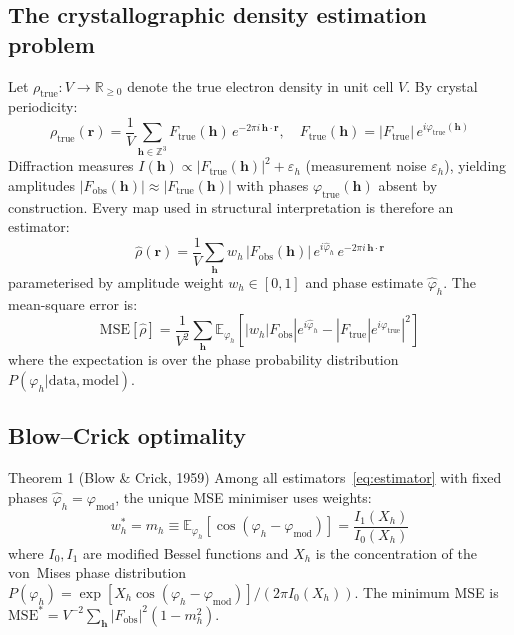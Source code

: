 \documentclass[10pt,twocolumn]{article}
\newcommand{\Fobs}{F_{\!\mathrm{obs}}}
\newcommand{\Ftrue}{F_{\!\mathrm{true}}}
\newcommand{\phimod}{\varphi_{\mathrm{mod}}}
\newcommand{\phitrue}{\varphi_{\mathrm{true}}}
\newcommand{\phih}{\varphi_h}
\newcommand{\mh}{m_h}
\newcommand{\Xh}{X_h}
\newcommand{\rhoT}{\rho_{\mathrm{true}}}
\newcommand{\Eop}{\mathbb{E}}
\newcommand{\boldh}{\mathbf{h}}
\newcommand{\boldr}{\mathbf{r}}
\begin{document}
\subsection{The crystallographic density estimation problem}

Let $\rhoT: V \to \mathbb{R}_{\geq 0}$ denote the true electron
density in unit cell $V$.  By crystal periodicity:
\begin{equation}
  \rhoT(\boldr)
  = \frac{1}{V}\sum_{\boldh \in \mathbb{Z}^3}
    \Ftrue(\boldh)\,e^{-2\pi i\,\boldh\cdot\boldr}, \quad
  \Ftrue(\boldh) = |\Ftrue|\,e^{i\phitrue(\boldh)}
  \label{eq:rho_true}
\end{equation}
Diffraction measures $I(\boldh) \propto |\Ftrue(\boldh)|^2 + \varepsilon_h$
(measurement noise $\varepsilon_h$), yielding amplitudes
$|\Fobs(\boldh)| \approx |\Ftrue(\boldh)|$ with phases
$\phitrue(\boldh)$ absent by construction.
Every map used in structural interpretation is therefore an estimator:
\begin{equation}
  \hat\rho(\boldr)
  = \frac{1}{V}\sum_{\boldh}
    w_h\,|\Fobs(\boldh)|\,e^{i\hat\varphi_h}\,
    e^{-2\pi i\,\boldh\cdot\boldr}
  \label{eq:estimator}
\end{equation}
parameterised by amplitude weight $w_h \in [0,1]$ and phase
estimate $\hat\varphi_h$.  The mean-square error is:
\begin{equation}
  \mathrm{MSE}[\hat\rho]
  = \frac{1}{V^2}\sum_{\boldh}
    \Eop_{\phih}\!\left[
      |w_h|\Fobs|e^{i\hat\varphi_h}
      - |\Ftrue|e^{i\phitrue}|^2
    \right]
  \label{eq:mse}
\end{equation}
where the expectation is over the phase probability distribution
$P(\phih | \mathrm{data}, \mathrm{model})$.

\subsection{Blow--Crick optimality}

\begin{mathbox}{Theorem 1 (Blow \& Crick, 1959)}
Among all estimators~\eqref{eq:estimator} with fixed phases
$\hat\varphi_h = \phimod$, the unique MSE minimiser uses weights:
\begin{equation}
  w_h^* = \mh \equiv
  \Eop_{\phih}\!\left[\cos(\phih - \phimod)\right]
  = \frac{I_1(\Xh)}{I_0(\Xh)}
  \label{eq:fom}
\end{equation}
where $I_0, I_1$ are modified Bessel functions and $\Xh$ is
the concentration of the von~Mises phase distribution
$P(\phih) = \exp[\Xh\cos(\phih-\phimod)] / (2\pi I_0(\Xh))$.
The minimum MSE is
$\mathrm{MSE}^* = V^{-2}\sum_\boldh |\Fobs|^2(1-\mh^2)$.
\end{mathbox}
\end{document}
